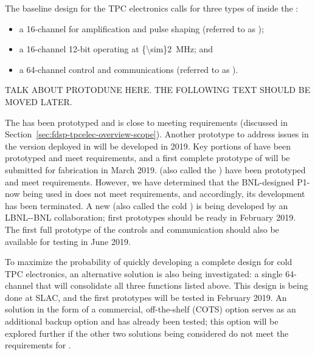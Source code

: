 The baseline design for the  TPC electronics calls for three 
types of  inside  the :
\begin{itemize}
\item{a \num{16}-channel   for amplification 
and pulse shaping (referred to as );}
\item{a \num{16}-channel \num{12}-bit   
operating at \SI{{\sim}2}{MHz}; and}
\item{a \num{64}-channel control and communications  
(referred to as ).}
\end{itemize}

TALK ABOUT PROTODUNE HERE. THE FOLLOWING TEXT SHOULD BE MOVED LATER.

The   has been prototyped and is close to meeting 
requirements (discussed in Section~\ref{sec:fdsp-tpcelec-overview-scope}). 
Another prototype to address issues in the version deployed in  
will be developed in 2019. Key portions of  have been
prototyped and meet requirements, and a first complete prototype of
 will be submitted for fabrication in March 2019.
 (also called the  ) have been prototyped and meet requirements.  However, we have determined that the BNL-designed P1-  now being used in  does not meet requirements, and accordingly, its development has been terminated.  A new   (also called the cold  ) is being developed by an LBNL-\fnal-BNL collaboration; first prototypes should be ready in February 2019.  The first full prototype of the controls and communication  should also be available for testing in June 2019.

To maximize the probability of quickly developing a complete design for cold TPC  electronics, an alternative solution is also being investigated: a single \num{64}-channel  that will consolidate all three functions listed above.  This design is being done at SLAC, and the first prototypes will be tested in February 2019.  An  solution in the form of a commercial, off-the-shelf (COTS) option serves as an additional backup option and has already been tested; this option will be explored further if the other two  solutions being considered do not meet the requirements for .

